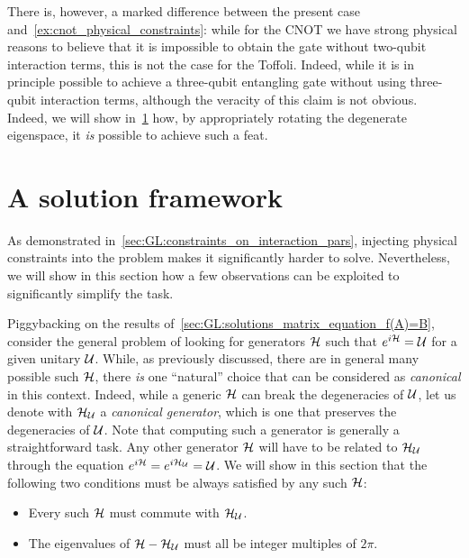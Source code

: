 \begin{example}[label={ex:toffoli_physical_constraints}]
There is, however, a marked difference between the present case and~\cref{ex:cnot_physical_constraints}: while for the CNOT we have strong physical reasons to believe that it is impossible to obtain the gate without two-qubit interaction terms, this is not the case for the Toffoli.
Indeed, while it is in principle possible to achieve a three-qubit entangling gate without using three-qubit interaction terms, although the veracity of this claim is not obvious.
Indeed, we will show in~\cref{sec:GL:solution_framework} how, by appropriately rotating the degenerate eigenspace, it \textit{is} possible to achieve such a feat.
\end{example}

\section{A solution framework}
\label{sec:GL:solution_framework}
As demonstrated in~\cref{sec:GL:constraints_on_interaction_pars}, injecting physical constraints into the problem makes it significantly harder to solve.
Nevertheless, we will show in this section how a few observations can be exploited to significantly simplify the task.

Piggybacking on the results of~\cref{sec:GL:solutions_matrix_equation_f(A)=B}, consider the general problem of looking for generators ${\mathcal{H}}$ such that $e^{i{\mathcal{H}}}={\mathcal{U}}$ for a given unitary ${\mathcal{U}}$.
While, as previously discussed, there are in general many possible such ${\mathcal{H}}$, there \textit{is} one ``natural'' choice that can be considered as \textit{canonical} in this context.
Indeed, while a generic ${\mathcal{H}}$ can break the degeneracies of ${\mathcal{U}}$, let us denote with ${\mathcal{H}}_{{\mathcal{U}}}$ a \textit{canonical generator}, which is one that preserves the degeneracies of ${\mathcal{U}}$.
Note that computing such a generator is generally a straightforward task.
Any other generator ${\mathcal{H}}$ will have to be related to ${\mathcal{H}}_{{\mathcal{U}}}$ through the equation $e^{i{\mathcal{H}}}=e^{i{\mathcal{H}}_{{\mathcal{U}}}}={\mathcal{U}}$.
We will show in this section that the following two conditions must be always satisfied by any such ${\mathcal{H}}$:
\begin{itemize}
    \item Every such ${\mathcal{H}}$ must commute with ${\mathcal{H}}_{{\mathcal{U}}}$.
    \item The eigenvalues of ${\mathcal{H}}-{\mathcal{H}}_{{\mathcal{U}}}$ must all be integer multiples of $2\pi$.
\end{itemize}

